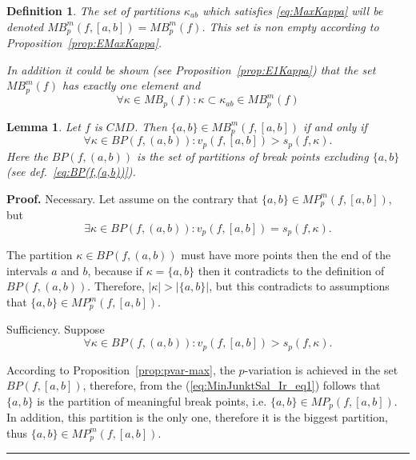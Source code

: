 \documentclass[12pt, a4paper]{article}
\newtheorem{lemma}[theorem]{Lemma}
\newtheorem{definition}[theorem]{Definition}
\newenvironment{proof}[1][Proof]{\noindent \textbf{#1.} }{\  \rule{0.5em}{0.5em}}
\numberwithin{equation}{section}
\begin{document}
\begin{definition} \label{def:MB^m} 
  The set of partitions $\kappa_{ab}$ which satisfies \ref{eq:MaxKappa}
  will be denoted $MB_{p}^m(f,[a,b])=MB_{p}^m(f)$.  
  This set is non empty according to Proposition~\ref{prop:EMaxKappa}.

  In addition it could be shown (see Proposition~\ref{prop:E1Kappa}) 
  that the set $MB_{p}^m(f)$ has exactly one element and 
  \begin{equation}
    \forall \kappa \in MB_{p}(f):\kappa \subset \kappa_{ab} \in MB_{p}^m(f)
  \end{equation}
\end{definition}

\begin{lemma}\label{lem:MinJunktSal} 
  Let $f$ is $CMD$. Then $\{a,b\} \in MB_{p}^m(f,[a,b])$
  if and only if
  \begin{equation*}
    \forall \kappa \in BP(f,(a,b)): v_p(f,[a,b]) > s_p(f, \kappa).
  \end{equation*} 
  Here the $BP(f,(a,b))$ is the set of partitions of break points
  excluding $\{a,b\}$ (see def.~\ref{eq:BP(f,(a,b))}).
\end{lemma}
\begin{proof} 
  Necessary. Let assume on the contrary that $\{a,b\} \in MP_{p}^m(f,[a,b])$, but
  \begin{equation*}
     \exists \kappa \in BP(f,(a,b)): v_p(f,[a,b]) = s_p(f, \kappa).
  \end{equation*} 
  
  The partition $\kappa \in BP(f,(a,b))$ must have more points then the end of the intervals $a$ and $b$,
  because if $\kappa = \{a,b\}$ then it contradicts to the definition of $BP(f,(a,b))$.
  Therefore, $|\kappa|>|\{a,b\}|$, but this contradicts to assumptions that $\{a,b\} \in MP_{p}^m(f,[a,b])$.
  
  Sufficiency. Suppose 
  \begin{equation}\label{eq:MinJunktSal_Ir_eq1}
    \forall \kappa \in BP(f,(a,b)): v_p(f,[a,b]) > s_p(f, \kappa).
  \end{equation} 
  
  According to Proposition~\ref{prop:pvar-max}, the $p$-variation is achieved in the set $BP(f,[a,b])$, 
  therefore, from the (\ref{eq:MinJunktSal_Ir_eq1}) follows that
  $\{a,b\}$ is the partition of meaningful break points, i.e. $\{a,b\} \in MP_{p}(f,[a,b])$. 
  In addition, this partition is the only one, therefore it is the biggest partition, thus 
  $\{a,b\} \in MP_{p}^m(f,[a,b])$.
\end{proof}    
\end{document}
